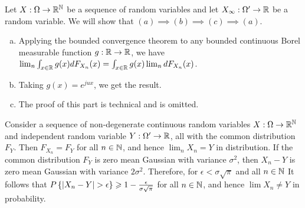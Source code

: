 \documentclass[12pt,aspectratio=169]{beamer}
\begin{document}
\begin{frame}
\begin{Proof}
Let $X:\Omega\to\mathbb{R}^{\mathbb{N}}$ be a sequence of random variables and let $X_\infty:\Omega'\to\mathbb{R}$ be a random variable. 
We will show that $(a) \implies (b) \implies (c) \implies (a)$.
\begin{enumerate}[(a)]
\item<1-> [$(a) \implies (b)$:] 
Applying the bounded convergence theorem to any bounded continuous Borel measurable function $g:\mathbb{R}\to\mathbb{R}$, we have $\lim_n\int_{x \in \mathbb{R}} g(x)dF_{X_n}(x) = \int_{x \in \mathbb{R}} g(x)\lim_ndF_{X_n}(x)$.
\item<2-> [$(b) \implies (c)$:] 
Taking $g(x) = e^{jux}$, we get the result. 
\item<3-> [$ (c) \implies (a)$:] 
The proof of this part is technical and is omitted.
\end{enumerate}
\end{Proof}
\end{frame}
\begin{frame}


\begin{Example} 
Consider a sequence of non-degenerate continuous \iid random variables $X:\Omega\to\mathbb{R}^{\mathbb{N}}$ and independent random variable $Y: \Omega'\to\mathbb{R}$, all with the common distribution $F_Y$. 
Then $F_{X_n} = F_Y$ for all $n \in \mathbb{N}$, and hence $\lim_nX_n = Y$ in distribution. 
If the common distribution $F_Y$ is zero mean Gaussian with variance $\sigma^2$, 
then $X_n - Y$ is zero mean Gaussian with variance $2\sigma^2$. 
Therefore, for $\epsilon < \sigma\sqrt{\pi}$ and all $n \in \mathbb{N}$
It follows that $P\left\{\left\lvert X_n - Y\right\rvert > \epsilon\right\} \geqslant 1- \frac{\epsilon}{\sigma\sqrt{\pi}}$ for all $n \in \mathbb{N}$, and hence $\lim X_n \neq Y$ in probability.
\end{Example}
\end{frame}
\end{document}
